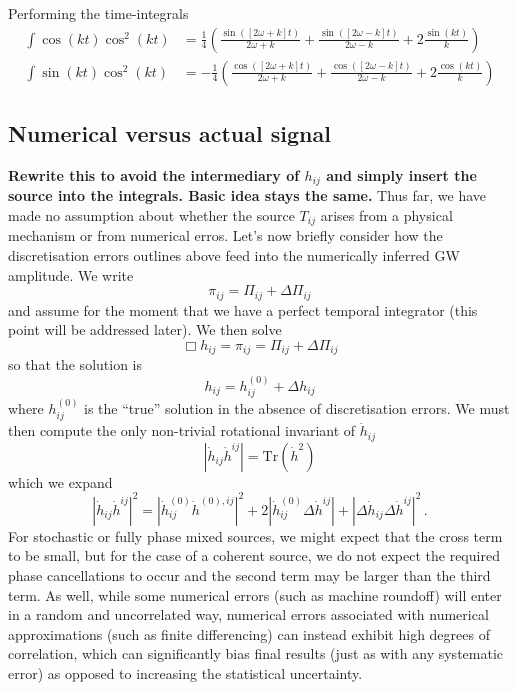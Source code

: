 \documentclass{revtex4}
\begin{document}
Performing the time-integrals
\begin{align}
  \int \cos(kt)\cos^2(kt) &= \frac{1}{4}\left(\frac{\sin([2\omega+k]t)}{2\omega+k} + \frac{\sin([2\omega-k]t)}{2\omega-k} + 2\frac{\sin(kt)}{k} \right) \\
  \int \sin(kt)\cos^2(kt) &= -\frac{1}{4}\left(\frac{\cos([2\omega+k]t)}{2\omega+k} + \frac{\cos([2\omega-k]t)}{2\omega-k} + 2\frac{\cos(kt)}{k} \right)
\end{align}

\subsection{Numerical versus actual signal}
{\bf Rewrite this to avoid the intermediary of $h_{ij}$ and simply insert the source into the integrals.  Basic idea stays the same.}
Thus far, we have made no assumption about whether the source $T_{ij}$ arises from a physical mechanism or from numerical erros.  Let's now briefly consider how the discretisation errors outlines above feed into the numerically inferred GW amplitude.
We write
\begin{equation}
  \pi_{ij} = \Pi_{ij} + \Delta\Pi_{ij}
\end{equation}
and assume for the moment that we have a perfect temporal integrator (this point will be addressed later).
We then solve
\begin{equation}
  \Box h_{ij} = \pi_{ij} = \Pi_{ij} + \Delta\Pi_{ij}
\end{equation}
so that the solution is
\begin{equation}
  h_{ij} = h_{ij}^{(0)} + \Delta h_{ij}
\end{equation}
where $h_{ij}^{(0)}$ is the ``true'' solution in the absence of discretisation errors.
We must then compute the only non-trivial rotational invariant of $\dot{h}_{ij}$
\begin{equation}
  \left|\dot{h}_{ij}\dot{h}^{ij}\right| = \mathrm{Tr}\left(\dot{h}^2\right)
\end{equation}
which we expand
\begin{equation}
  \left|\dot{h}_{ij}\dot{h}^{ij} \right|^2 = \left|\dot{h}_{ij}^{(0)}\dot{h}^{(0),ij}\right|^2 + 2\left|\dot{h}_{ij}^{(0)}\Delta\dot{h}^{ij}\right| + \left|\Delta\dot{h}_{ij}\Delta\dot{h}^{ij}\right|^2 \, .
\end{equation}
For stochastic or fully phase mixed sources, we might expect that the cross term to be small, but for the case of a coherent source, we do not expect the required phase cancellations to occur and the second term may be larger than the third term.  As well, while some numerical errors (such as machine roundoff) will enter in a random and uncorrelated way, numerical errors associated with numerical approximations (such as finite differencing) can instead exhibit high degrees of correlation, which can significantly bias final results (just as with any systematic error) as opposed to increasing the statistical uncertainty.
\end{document}

